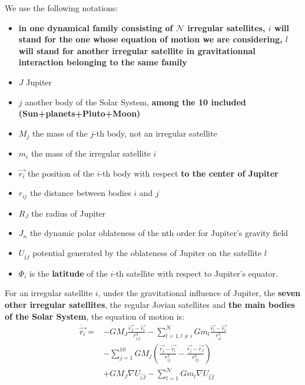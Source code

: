 \documentclass[useAMS,usenatbib]{mn2e}
\begin{document}
We use the following notations: \begin{itemize}
\item \textbf{in one dynamical family consisting of $\mathcal{N}$ irregular satellites, $i$ will stand for the one whose equation of motion we are considering, $l$ will stand for another irregular satellite in gravitationnal interaction belonging to the same family}
\item $J$ Jupiter
\item $j$ another body of the Solar System, \textbf{among the 10 included (Sun+planets+Pluto+Moon)}
\item $M_j$ the mass of the $j$-th body, not an irregular satellite
\item $m_i$ the mass of the irregular satellite $i$
\item $\vec{r_i}$ the position of the $i$-th body with respect \textbf{to the center of Jupiter}
\item $r_{ij}$ the distance between bodies $i$ and $j$
\item $R_J$ the radius of Jupiter
\item $J_n$ the dynamic polar oblateness of the nth order for Jupiter's gravity field
\item $U_{\bar{l}\hat{J}}$ potential generated by the oblateness of Jupiter on the satellite $l$
\item $\Phi_i$ is the \textbf{latitude} of the $i$-th satellite with respect to Jupiter's equator.
\end{itemize}

For an irregular satellite $i$, under the gravitational influence of Jupiter, the \textbf{seven other irregular satellites}, the regular Jovian satellites and\textbf{ the main bodies of the Solar System}, the equation of motion is:
\begin{equation}
\label{Eq:eq1}
\begin{array}{ll}

\ddot{\vec{r_i}}= & \displaystyle -GM_J\frac{\vec{r_J}-\vec{r_i}}{r_{iJ}^3}-\sum_{l=1,l\neq i}^\mathcal{N} Gm_l\frac{\vec{r_l}-\vec{r_i}}{r_{il}^3}\\
&\displaystyle -\sum_{j=1}^{10}GM_j \left(\frac{\vec{r_j}-\vec{r_i}}{r_{ij}^3} - \frac{\vec{r_j}-\vec{r_J}}{r_{Jj}^3} \right)\\
 & \displaystyle +GM_J \nabla U_{\bar{i}\hat{J}} -\sum_{l=1}^\mathcal{N} Gm_l\nabla U_{\bar{l}\hat{J}}
\end{array}
\end{equation}
\end{document}

